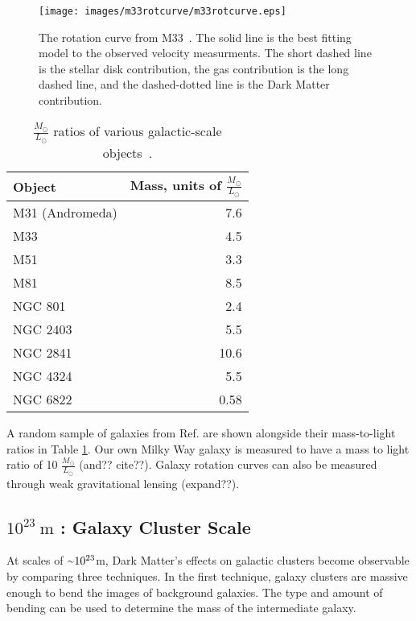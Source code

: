     \begin{figure}[ht]
      \texttt{[image: images/m33rotcurve/m33rotcurve.eps]}
      \caption[M33 Rotation Curve]{
        The rotation curve from M33~\cite{m33rotcurve}.
        The solid line is the best fitting model to the observed velocity measurments.
        The short dashed line is the stellar disk contribution, the gas contribution is the long dashed line, and the dashed-dotted line is the Dark Matter contribution.
      }
      \label{fig:m33rotcurve}
    \end{figure}
    
    \begin{table}[]
      \centering
      \caption{$\frac{M_\odot}{L_\odot}$ ratios of various galactic-scale objects~\cite{faber_ml}.}
      \label{tab:mlratios}
      \begin{tabular}{l r}
        Object          & Mass, units of $\frac{M_\odot}{L_\odot}$ \\
        \hline
        M31 (Andromeda) &  7.6  \\
        M33             &  4.5  \\
        M51             &  3.3  \\
        M81             &  8.5  \\
        NGC 801         &  2.4  \\
        NGC 2403        &  5.5  \\
        NGC 2841        & 10.6  \\
        NGC 4324        &  5.5  \\
        NGC 6822        &  0.58 \\
      \end{tabular}
    \end{table}
      
    A random sample of galaxies from Ref. \cite{faber_ml} are shown alongside their mass-to-light ratios in Table \ref{tab:mlratios}.
    Our own Milky Way galaxy is measured to have a mass to light ratio of 10 $\frac{M_{\odot}}{L_{\odot}}$ {\color{red}(and?? cite??)}.
    Galaxy rotation curves can also be measured through weak gravitational lensing \cite{weak_lensing_2001} {\color{red}(expand??)}.

  \subsection{$10^{23}\:\text{m}$ : Galaxy Cluster Scale}
    At scales of $\nicetilde 10^{23}$m, Dark Matter's effects on galactic clusters become observable by comparing three techniques.
    In the first technique, galaxy clusters are massive enough to bend the images of background galaxies.
    The type and amount of bending can be used to determine the mass of the intermediate galaxy.

